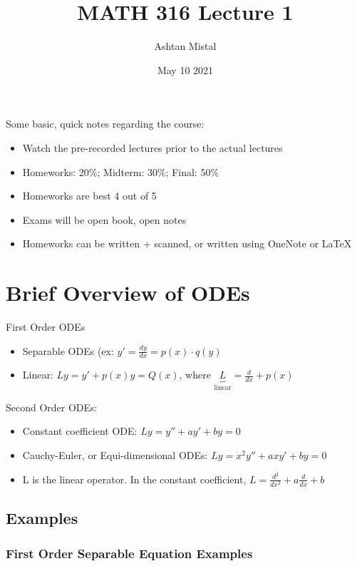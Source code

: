 \documentclass{article}
\title{MATH 316 Lecture 1}
\author{Ashtan Mistal}
\date{May 10 2021}
\begin{document}
\ifstandalone
\maketitle
\fi

\graphicspath{{./Lecture01/}}

Some basic, quick notes regarding the course:

\begin{itemize}
    \item Watch the pre-recorded lectures prior to the actual lectures
    \item Homeworks: 20\%; Midterm: 30\%; Final: 50\%
    \item Homeworks are best 4 out of 5
    \item Exams will be open book, open notes
    \item Homeworks can be written + scanned, or written using OneNote or \LaTeX
\end{itemize}

\section{Brief Overview of ODEs}

First Order ODEs

\begin{itemize}
    \item Separable ODEs (ex: $y' = \frac{dy}{dx} = p(x) \cdot q(y)$
    \item Linear: $Ly = y' + p(x) y = Q(x)$, where $\underbrace{L}_{\text{linear}} = \frac{d}{dx} + p(x)$
\end{itemize}

Second Order ODEs:

\begin{itemize}
    \item Constant coefficient ODE: $Ly = y'' + a y' + by = 0$
    \item Cauchy-Euler, or Equi-dimensional ODEs: $Ly = x^2 y'' + a x y' + by = 0$
    \item L is the linear operator. In the constant coefficient, $L = \frac{d^2}{dx^2} + a \frac{d}{dx} + b$ 
\end{itemize}

\subsection{Examples}
\subsubsection{First Order Separable Equation Examples}
\end{document}
